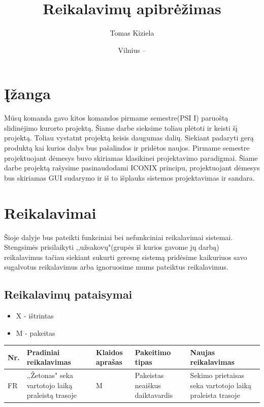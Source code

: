 \documentclass[oneside]{VUMIFPSkursinis}
\title{Reikalavimų apibrėžimas}
\author{Tomas Kiziela}
\date{Vilnius – \the\year}
\begin{document}
\maketitle
\tableofcontents

\section{Įžanga}
Mūsų komanda gavo kitos komandos pirmame semestre(PSI I) paruoštą slidinėjimo kurorto projektą. Šiame darbe sieksime toliau plėtoti ir keisti šį projektą. Toliau vystatnt projektą keisis daugumas dalių. Siekiant padaryti gerą produktą kai kurios  dalys bus pašalindos ir pridėtos naujos. Pirmame semestre projektuojant dėmesys buvo skiriamas klasikinei projektavimo paradigmai. Šiame darbe projektą rašysime pasinaudodami ICONIX principu, projektuojant dėmesys bus skiriamas GUI sudarymo ir iš to išplauks sistemos projektavimas ir sandara. 

\section{Reikalavimai}
Šioje dalyje bus pateikti funkciniai bei nefunkciniai reikalavimai sistemai. Stengsimės prisilaikyti ,,užsakovų"(grupės iš kurios gavome jų darbą) reikalavimus tačiau siekiant sukurti geresnę sistemą pridėsime kaikuriuos savo sugalvotus reikalavimus arba ignoruosime mums pateiktus reikalavimus. 

\subsection{Reikalavimų pataisymai}
	\begin{itemize}
		\item{X - ištrintas}
		\item{M - pakeitas}
	\end{itemize}


\begin{table}[htbp]

\begin{tabularx}{1\textwidth}{  |P{1cm}|X|P{2cm}|p{2cm}|X| }  \hline
	Nr. & Pradiniai reikalavimas& Klaidos aprašas & Pakeitimo tipas & Naujas reikalavimas \\ \hline
	FR & ,,Žetonas" seka vartotojo laiką praleistą trasoje & M & Pakeistas neaiškus daiktavardis & Sekimo prietaisas seka vartotojo laiką praleista trasoje \\ \hline
	

	
	

\end{tabularx}

	
\end{table}
\end{document}
